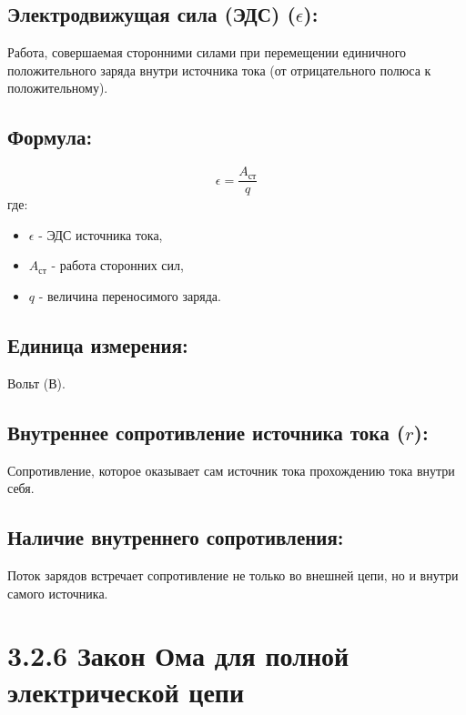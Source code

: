 \documentclass[a4paper,12pt]{article}
\begin{document}
\subsection*{Электродвижущая сила (ЭДС) ($\epsilon$):}
\vspace{-3pt}
Работа, совершаемая сторонними силами при перемещении единичного положительного заряда внутри источника тока (от отрицательного полюса к положительному).

\vspace{-9pt}
\subsection*{Формула:}
\vspace{-3pt}
\vspace{-0.05em}
$$ \epsilon = \frac{A_{ст}}{q} $$
где:
\begin{itemize}
    \item $\epsilon$ - ЭДС источника тока,
    \item $A_{ст}$ - работа сторонних сил,
    \item $q$ - величина переносимого заряда.
\end{itemize}

\vspace{-9pt}
\subsection*{Единица измерения:}
\vspace{-3pt}
Вольт (В).

\vspace{-9pt}
\subsection*{Внутреннее сопротивление источника тока ($r$):}
\vspace{-3pt}
Сопротивление, которое оказывает сам источник тока прохождению тока внутри себя.

\vspace{-9pt}
\subsection*{Наличие внутреннего сопротивления:}
\vspace{-3pt}
Поток зарядов встречает сопротивление не только во внешней цепи, но и внутри самого источника.

\newpage
\section*{3.2.6 Закон Ома для полной электрической цепи}
\vspace{-9pt}
\end{document}
